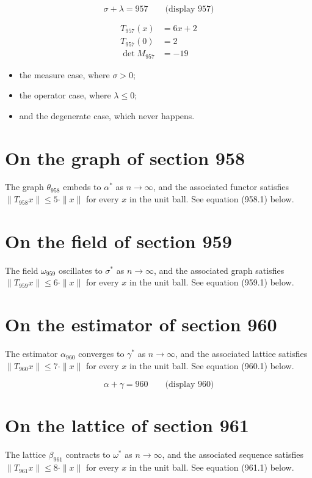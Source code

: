 \documentclass{article}
\begin{document}
$$
\sigma + \lambda = 957 \qquad \text{(display 957)}
$$

\begin{align}
T_{957}(x) &= 6 x + 2 \\
T_{957}(0) &= 2 \\
\det M_{957} &= -19
\end{align}

\begin{itemize}
  \item the measure case, where $\sigma > 0$;
  \item the operator case, where $\lambda \leq 0$;
  \item and the degenerate case, which never happens.
\end{itemize}

\section{On the graph of section 958}
The graph $\theta_{958}$ embeds to $\alpha^{*}$ as $n \to \infty$,
and the associated functor satisfies $\|T_{958} x\| \leq 5 \cdot \|x\|$
for every $x$ in the unit ball. See equation (958.1) below.

\section{On the field of section 959}
The field $\omega_{959}$ oscillates to $\sigma^{*}$ as $n \to \infty$,
and the associated graph satisfies $\|T_{959} x\| \leq 6 \cdot \|x\|$
for every $x$ in the unit ball. See equation (959.1) below.

\section{On the estimator of section 960}
The estimator $\alpha_{960}$ converges to $\gamma^{*}$ as $n \to \infty$,
and the associated lattice satisfies $\|T_{960} x\| \leq 7 \cdot \|x\|$
for every $x$ in the unit ball. See equation (960.1) below.

$$
\alpha + \gamma = 960 \qquad \text{(display 960)}
$$

\section{On the lattice of section 961}
The lattice $\beta_{961}$ contracts to $\omega^{*}$ as $n \to \infty$,
and the associated sequence satisfies $\|T_{961} x\| \leq 8 \cdot \|x\|$
for every $x$ in the unit ball. See equation (961.1) below.
\end{document}
